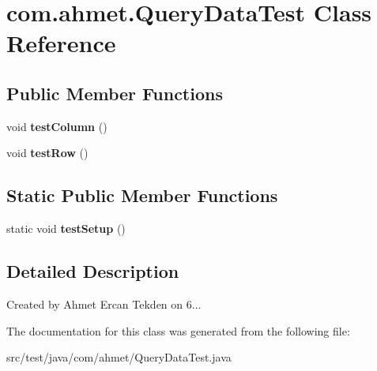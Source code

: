 \hypertarget{classcom_1_1ahmet_1_1_query_data_test}{}\section{com.\+ahmet.\+Query\+Data\+Test Class Reference}
\label{classcom_1_1ahmet_1_1_query_data_test}
\subsection*{Public Member Functions}
\begin{DoxyCompactItemize}
\item 
void {\bfseries test\+Column} ()\hypertarget{classcom_1_1ahmet_1_1_query_data_test_aacd06ea409eb7bcaaf88fee8521c73e2}{}\label{classcom_1_1ahmet_1_1_query_data_test_aacd06ea409eb7bcaaf88fee8521c73e2}

\item 
void {\bfseries test\+Row} ()\hypertarget{classcom_1_1ahmet_1_1_query_data_test_a7ac076eaca5768c2c949663864708ce4}{}\label{classcom_1_1ahmet_1_1_query_data_test_a7ac076eaca5768c2c949663864708ce4}

\end{DoxyCompactItemize}
\subsection*{Static Public Member Functions}
\begin{DoxyCompactItemize}
\item 
static void {\bfseries test\+Setup} ()\hypertarget{classcom_1_1ahmet_1_1_query_data_test_aea85bf8914c3849838f67bc791a4e4eb}{}\label{classcom_1_1ahmet_1_1_query_data_test_aea85bf8914c3849838f67bc791a4e4eb}

\end{DoxyCompactItemize}


\subsection{Detailed Description}
Created by Ahmet Ercan Tekden on 6... 

The documentation for this class was generated from the following file\+:\begin{DoxyCompactItemize}
\item 
src/test/java/com/ahmet/Query\+Data\+Test.\+java\end{DoxyCompactItemize}
